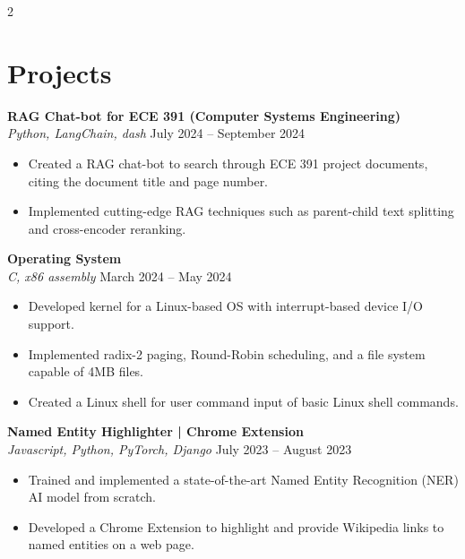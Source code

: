 \documentclass[letterpaper,10pt]{article}
\begin{document}
\begin{paracol}{2}
    
    \section{Projects}
    \textbf{RAG Chat-bot for ECE 391 (Computer Systems Engineering)}\\
    \textit{Python, LangChain, dash} \hfill July 2024 -- September 2024\vspace{-5pt}
    \begin{itemize}[leftmargin=0.25in, itemsep=-5pt, parsep=5pt]
        \item Created a RAG chat-bot to search through ECE 391 project documents, citing the document title and page number.
        \item Implemented cutting-edge RAG techniques such as parent-child text splitting and cross-encoder reranking.
    \end{itemize}
    
    \textbf{Operating System}\\
    \textit{C, x86 assembly} \hfill March 2024 -- May 2024\vspace{-5pt}
    \begin{itemize}[leftmargin=0.25in, itemsep=-5pt, parsep=5pt]
        \item Developed kernel for a Linux-based OS with interrupt-based device I/O support.
        \item Implemented radix-2 paging, Round-Robin scheduling, and a file system capable of 4MB files.
        \item Created a Linux shell for user command input of basic Linux shell commands.
    \end{itemize}
    
    \textbf{Named Entity Highlighter | Chrome Extension}\\
    \textit{Javascript, Python, PyTorch, Django} \hfill July 2023 -- August 2023\vspace{-5pt}
    \begin{itemize}[leftmargin=0.25in, itemsep=-5pt, parsep=5pt]
        \item Trained and implemented a state-of-the-art Named Entity Recognition (NER) AI model from scratch.
        \item Developed a Chrome Extension to highlight and provide Wikipedia links to named entities on a web page.
    \end{itemize}
    
\end{paracol}
\end{document}
